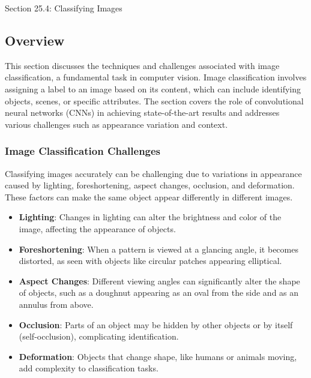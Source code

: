 \begin{notes}{Section 25.4: Classifying Images}
    \subsection*{Overview}

    This section discusses the techniques and challenges associated with image classification, a fundamental task in computer vision. Image classification involves assigning a label to an image based on its 
    content, which can include identifying objects, scenes, or specific attributes. The section covers the role of convolutional neural networks (CNNs) in achieving state-of-the-art results and addresses 
    various challenges such as appearance variation and context.
    
    \subsubsection*{Image Classification Challenges}
    
    Classifying images accurately can be challenging due to variations in appearance caused by lighting, foreshortening, aspect changes, occlusion, and deformation. These factors can make the same object 
    appear differently in different images.
    
    \begin{highlight}
    
        \begin{itemize}
            \item \textbf{Lighting}: Changes in lighting can alter the brightness and color of the image, affecting the appearance of objects.
            \item \textbf{Foreshortening}: When a pattern is viewed at a glancing angle, it becomes distorted, as seen with objects like circular patches appearing elliptical.
            \item \textbf{Aspect Changes}: Different viewing angles can significantly alter the shape of objects, such as a doughnut appearing as an oval from the side and as an annulus from above.
            \item \textbf{Occlusion}: Parts of an object may be hidden by other objects or by itself (self-occlusion), complicating identification.
            \item \textbf{Deformation}: Objects that change shape, like humans or animals moving, add complexity to classification tasks.
        \end{itemize}
    

\end{highlight}
\end{notes}
